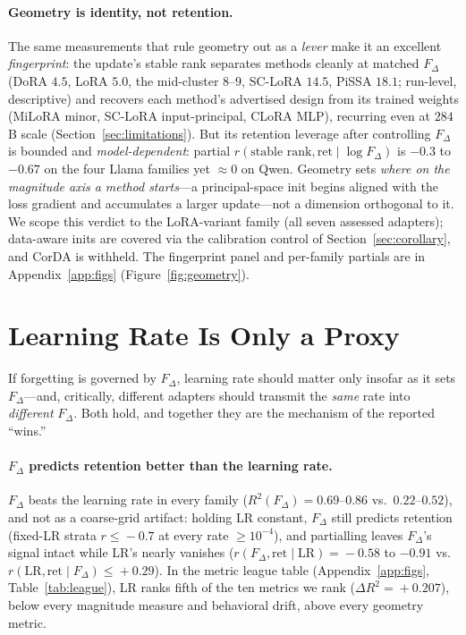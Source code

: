 \documentclass[11pt]{article}
\newcommand{\dw}{F_{\Delta}}
\begin{document}
\paragraph{Geometry is identity, not retention.} The same measurements that rule
geometry out as a \emph{lever} make it an excellent \emph{fingerprint}: the
update's stable rank separates methods cleanly at matched $\dw$ (DoRA $4.5$, LoRA
$5.0$, the mid-cluster $8$--$9$, SC-LoRA $14.5$, PiSSA $18.1$; run-level,
descriptive) and recovers each method's advertised design from its trained weights
(MiLoRA minor, SC-LoRA input-principal, CLoRA MLP), recurring even at $284$B scale
(Section~\ref{sec:limitations}). But its retention leverage after controlling
$\dw$ is bounded and \emph{model-dependent}: partial $r(\text{stable
rank},\text{ret}\mid\log\dw)$ is $-0.3$ to $-0.67$ on the four Llama families yet
$\approx\!0$ on Qwen. Geometry sets \emph{where on the magnitude axis a method
starts}---a principal-space init begins aligned with the loss gradient and
accumulates a larger update---not a dimension orthogonal to it. We scope this
verdict to the LoRA-variant family (all seven assessed adapters); data-aware inits
are covered via the calibration control of Section~\ref{sec:corollary}, and CorDA
is withheld. The fingerprint panel and per-family partials are in
Appendix~\ref{app:figs} (Figure~\ref{fig:geometry}).

\section{Learning Rate Is Only a Proxy}\label{sec:lr}
If forgetting is governed by $\dw$, learning rate should matter only insofar as it
sets $\dw$---and, critically, different adapters should transmit the \emph{same}
rate into \emph{different} $\dw$. Both hold, and together they are the mechanism
of the reported ``wins.''

\paragraph{$\dw$ predicts retention better than the learning rate.} $\dw$ beats
the learning rate in every family ($R^2(\dw)\!=\!0.69$--$0.86$ vs.\
$0.22$--$0.52$), and not as a coarse-grid artifact: holding LR constant, $\dw$
still predicts retention (fixed-LR strata $r\!\le\!-0.7$ at every rate
$\ge\!10^{-4}$), and partialling leaves $\dw$'s signal intact while LR's nearly
vanishes ($r(\dw,\text{ret}\mid\text{LR})\!=\!-0.58$ to $-0.91$ vs.\
$r(\text{LR},\text{ret}\mid\dw)\!\le\!+0.29$). In the metric league table
(Appendix~\ref{app:figs}, Table~\ref{tab:league}), LR ranks fifth of the ten
metrics we rank ($\Delta R^2\!=\!+0.207$), below every magnitude measure and
behavioral drift, above every geometry metric.
\end{document}

